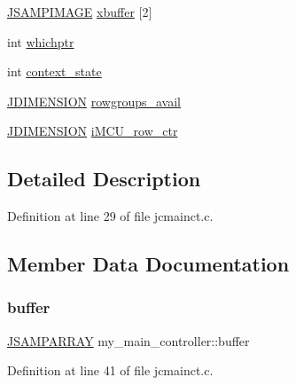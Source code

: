 \begin{DoxyCompactItemize}
\item 
\mbox{\hyperlink{jpeglib_8h_a4bf858e4d42202287e786bdec2f3b62b}{J\+S\+A\+M\+P\+I\+M\+A\+GE}} \mbox{\hyperlink{structmy__main__controller_a29fc35521c04489fdb6b7a7e758fb82a}{xbuffer}} \mbox{[}2\mbox{]}
\item 
int \mbox{\hyperlink{structmy__main__controller_a9838025ca47813221e8c208ad26bb9e8}{whichptr}}
\item 
int \mbox{\hyperlink{structmy__main__controller_abc90e17934b16420478e95a8875918ae}{context\+\_\+state}}
\item 
\mbox{\hyperlink{jmorecfg_8h_a04ed4674f6f1d0d50ec241531e38274f}{J\+D\+I\+M\+E\+N\+S\+I\+ON}} \mbox{\hyperlink{structmy__main__controller_a8fdc8a382fc0be7922e5913b16cbf7dc}{rowgroups\+\_\+avail}}
\item 
\mbox{\hyperlink{jmorecfg_8h_a04ed4674f6f1d0d50ec241531e38274f}{J\+D\+I\+M\+E\+N\+S\+I\+ON}} \mbox{\hyperlink{structmy__main__controller_a01c8f176e423a5d8e37637fa8210b236}{i\+M\+C\+U\+\_\+row\+\_\+ctr}}
\end{DoxyCompactItemize}


\subsection{Detailed Description}


Definition at line 29 of file jcmainct.\+c.



\subsection{Member Data Documentation}
\mbox{\label{structmy__main__controller_a448676ac307b69b99e5457744515f058}} 
\subsubsection{\texorpdfstring{buffer}{buffer}}
{\footnotesize\ttfamily \mbox{\hyperlink{jpeglib_8h_ac9d5d1b829ed51769db69a37271a7e91}{J\+S\+A\+M\+P\+A\+R\+R\+AY}} my\+\_\+main\+\_\+controller\+::buffer}



Definition at line 41 of file jcmainct.\+c.

\mbox{\label{structmy__main__controller_a6cd3c916b4d87c97f6fda7daa0816256}} 
